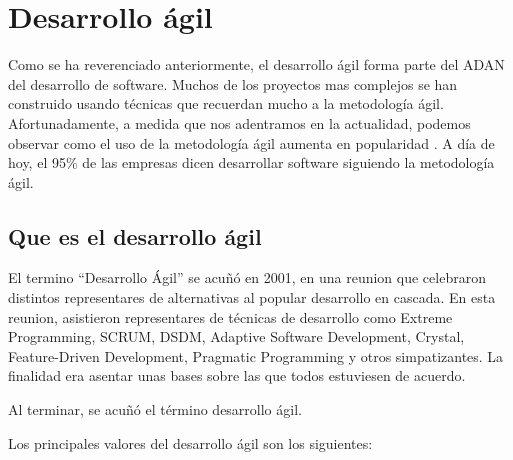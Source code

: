 \documentclass[12pt]{report} %
\begin{document}
\section{Desarrollo ágil}

Como se ha reverenciado anteriormente, el desarrollo ágil forma parte del ADAN
del desarrollo de software.  Muchos de los proyectos mas complejos se han
construido usando técnicas que recuerdan mucho a la metodología ágil.
\cite{GW-PM} Afortunadamente, a medida que nos adentramos en la actualidad,
podemos observar como el uso de la metodología ágil aumenta en popularidad
\cite{Hoyada}.  A día de hoy, el 95\% de las empresas dicen desarrollar software
siguiendo la metodología ágil. \cite{stateofagile}

\subsection{Que es el desarrollo ágil}


El termino ``Desarrollo Ágil'' se acuñó en 2001, en una reunion que celebraron
distintos representares de alternativas al popular desarrollo en cascada.  En
esta reunion, asistieron representares de técnicas de desarrollo como Extreme
Programming, SCRUM, DSDM, Adaptive Software Development, Crystal, Feature-Driven
Development, Pragmatic Programming y otros simpatizantes.  La finalidad era
asentar unas bases sobre las que todos estuviesen de acuerdo.

Al terminar, se acuñó el término desarrollo ágil.

Los principales valores del desarrollo ágil son los siguientes:
\cite{agilePrinciples}
\end{document}

